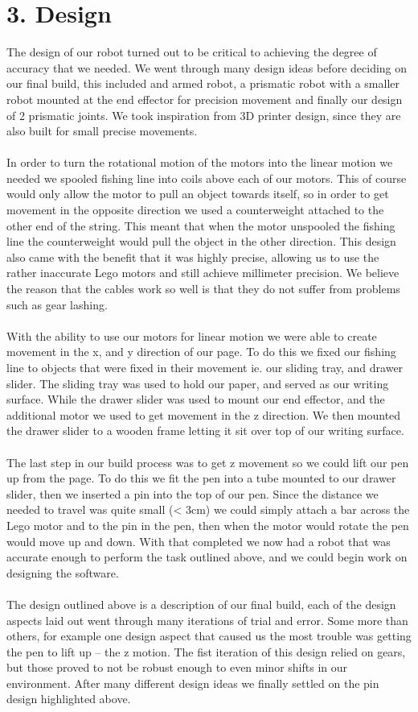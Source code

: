 \documentclass[letterpaper]{article}
\begin{document}
\section{3. Design}
The design of our robot turned out to be critical to achieving the degree of accuracy that we needed. We went through many design ideas before deciding on our final build, this included and armed robot, a prismatic robot with a smaller robot mounted at the end effector for precision movement and finally our design of 2 prismatic joints. We took inspiration from 3D printer design, since they are also built for small precise movements.\\\\
%
In order to  turn the rotational motion of the motors into the linear motion we needed we spooled fishing line into coils above each of our motors. This of course would only allow the motor to pull an object towards itself, so in order to get movement in the opposite direction we used a counterweight attached to the other end of the string. This meant that when the motor unspooled the fishing line the counterweight would pull the object in the other direction. This design also came with the benefit that it was highly precise, allowing us to use the rather inaccurate Lego motors and still achieve millimeter precision. We believe the reason that the cables work so well is that they do not suffer from problems such as gear lashing.\\\\
% 
With the ability to use our motors for  linear motion we were able to create movement in the x, and y direction of our page. To do this we fixed our fishing line to objects that were fixed in their movement ie. our sliding tray, and drawer slider. The sliding tray was used to hold our paper, and served as our writing surface. While the drawer slider was used to mount our end effector, and the additional motor we used to get movement in the z direction. We then mounted the drawer slider to a wooden frame letting it sit over top of our writing surface. \\\\
%
The last step in our build process was to get z movement so we could lift our pen up from the page. To do this we fit the pen into a tube mounted to our drawer slider, then we inserted a pin into the top of our pen. Since the distance we needed to travel was quite small (< 3cm) we could simply attach a bar across the Lego motor and to the pin in the pen, then when the motor would rotate the pen would move up and down. With that completed we now had a robot that was accurate enough to perform the task outlined above, and we could begin work on designing the software. \\\\
%
The design outlined above is a description of our final build, each of the design aspects laid out went through many iterations of trial and error. Some more than others, for example one design aspect that caused us the most trouble was getting the pen to lift up -- the z motion. The fist iteration of this design relied on gears, but those proved to not be robust enough to even minor shifts in our environment. After many different design ideas we finally settled on the pin design highlighted above.
\end{document}

